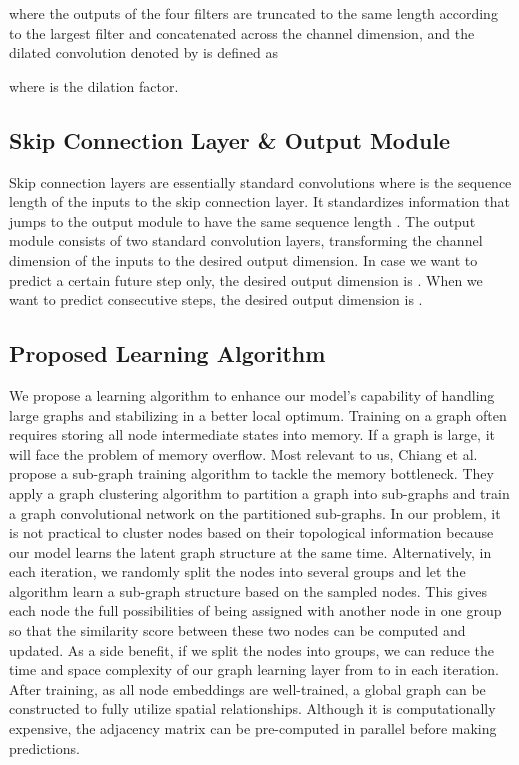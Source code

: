 \documentclass[sigconf]{acmart}
\begin{document}
where the outputs of the four filters are truncated to the same length according to the largest filter and concatenated across the channel dimension, and the dilated convolution denoted by  is defined as

where  is the dilation factor.




\begin{comment}

We can derive the upper bound for choosing ,

where  and  is considered as constants.
\end{comment}

\subsection{Skip Connection Layer \& Output Module}
Skip connection layers are essentially  standard convolutions where  is the sequence length of the inputs to the  skip connection layer. It standardizes information that jumps to the output module to have the same sequence length . The output module consists of two  standard convolution layers, transforming the channel dimension of the inputs to the desired output dimension. In case we want to predict a certain future step only, the desired output dimension is . When we want to predict  consecutive steps, the desired output dimension is .


\subsection{Proposed Learning Algorithm}
\label{sec:algo}
We propose a learning algorithm to enhance our model's capability of handling large graphs and stabilizing in a better local optimum. Training on a graph often requires storing all node intermediate states into memory. If a graph is large, it will face the problem of memory overflow. Most relevant to us, Chiang et al.  \cite{chiang2019cluster} propose a sub-graph training algorithm to tackle the memory bottleneck. They apply a graph clustering algorithm to partition a graph into sub-graphs and train a graph convolutional network on the partitioned sub-graphs. In our problem, it is not practical to cluster nodes based on their topological information because our model learns the latent graph structure at the same time. Alternatively, in each iteration, we randomly split the nodes into several groups and let the algorithm learn a sub-graph structure based on the sampled nodes. This gives each node the full possibilities of being assigned with another node in one group so that the similarity score between these two nodes can be computed and updated. As a side benefit, if we split the nodes into  groups, we can reduce the time and space complexity of our graph learning layer from  to  in each iteration. After training, as all node embeddings are well-trained, a global graph can be constructed to fully utilize spatial relationships. Although it is computationally expensive, the adjacency matrix can be pre-computed in parallel before making predictions. 
\end{document}
